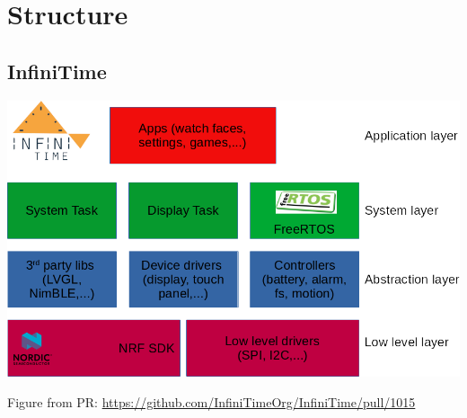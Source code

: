 \documentclass{beamer}
\begin{document}
\section{Structure}
\subsection{InfiniTime}
\begin{frame}{}
  \includegraphics[width=\textwidth]{../architecture_infinitime}

  \small Figure from PR: 
  \href{https://github.com/InfiniTimeOrg/InfiniTime/pull/1015}{https://github.com/InfiniTimeOrg/InfiniTime/pull/1015}{}
\end{frame}
\end{document}
